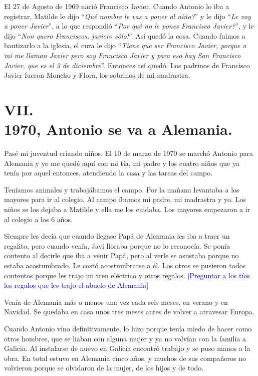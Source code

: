 \documentclass[12pt,a5paper]{book}
\begin{document}
 El 27 de Agosto de 1969 nació Francisco Javier. Cuando Antonio lo iba a registrar, Matilde le dijo ``\textit{Qué nombre le vas a poner al niño?}'' y le dijo ``\textit{Le voy a poner Javier}'', a lo que respondió ``\textit{Por qué no le pones Francisco Javier?}'', y le dijo ``\textit{Non quero Franciscos, javiero sólo!}''. Así quedó la cosa. Cuando fuimos a bautizarlo a la iglesia, el cura le dijo ``\textit{Tiene que ser Francisco Javier, porque a mi me llaman Javier pero soy Francisco Javier y para eso hay San Francisco Javier, que es el 3 de diciembre}''. Entonces así quedó. Los padrinos de Francisco Javier fueron Moncho y Flora, los sobrinos de mi madrastra.


\section*{VII.\\1970, Antonio se va a Alemania.}

Pasé mi juventud criando niños. El 10 de marzo de 1970 se marchó Antonio para Alemania y yo me quedé aquí con mi tía, mi padre y los cuatro niños que ya tenía por aquel entonces, atendiendo la casa y las tareas del campo.

Teníamos animales y trabajábamos el campo. Por la mañana levantaba a los mayores para ir al colegio. Al campo íbamos mi padre, mi madrastra y yo. Los niños se los dejaba a Matilde y ella me los cuidaba. Los mayores empezaron a ir al colegio a los 6 años.

Siempre les decía que cuando llegase Papá de Alemania les iba a traer un regalito, pero cuando venía, Javi lloraba porque no lo reconocía. Se ponía contento al decirle que iba a venir Papá, pero al verle se asustaba porque no estaba acostumbrado. Le costó acostumbrarse a él. Los otros se pusieron todos contentos porque les trajo un tren eléctrico y otros regalos. \textcolor{blue}{[Preguntar a los tíos los regalos que les trajo el abuelo de Alemania]} 

Venía de Alemania más o menos una vez cada seis meses, en verano y en Navidad. Se quedaba en casa unos tres meses antes de volver a atravesar Europa.

Cuando Antonio vino definitivamente, lo hizo porque tenía miedo de hacer como otros hombres, que se liaban con alguna mujer y ya no volvían con la familia a Galicia. Al instalarse de nuevo en Galicia encontró trabajo y se puso manos a la obra. En total estuvo en Alemania cinco años, y muchos de sus compañeros no volvieron porque se olvidaron de la mujer, de los hijos y de todo.
\end{document}
